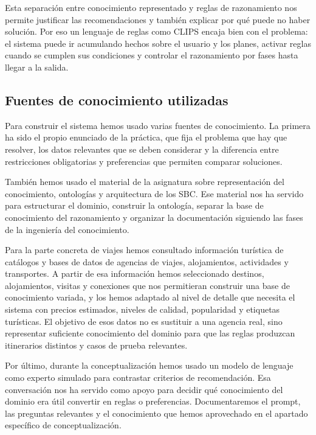 \documentclass[11pt,a4paper]{article}
\begin{document}
Esta separaci\'on entre conocimiento representado y reglas de razonamiento nos
permite justificar las recomendaciones y tambi\'en explicar por qu\'e puede no
haber soluci\'on. Por eso un lenguaje de reglas como CLIPS encaja bien con el
problema: el sistema puede ir acumulando hechos sobre el usuario y los planes,
activar reglas cuando se cumplen sus condiciones y controlar el razonamiento
por fases hasta llegar a la salida.

\subsection{Fuentes de conocimiento utilizadas}
Para construir el sistema hemos usado varias fuentes de conocimiento. La
primera ha sido el propio enunciado de la pr\'actica, que fija el problema que
hay que resolver, los datos relevantes que se deben considerar y la diferencia
entre restricciones obligatorias y preferencias que permiten comparar
soluciones.

Tambi\'en hemos usado el material de la asignatura sobre representaci\'on del
conocimiento, ontolog\'ias y arquitectura de los SBC. Ese material nos ha
servido para estructurar el dominio, construir la ontolog\'ia, separar la base de
conocimiento del razonamiento y organizar la documentaci\'on siguiendo las
fases de la ingenier\'ia del conocimiento.

Para la parte concreta de viajes hemos consultado informaci\'on tur\'istica de
cat\'alogos y bases de datos de agencias de viajes, alojamientos, actividades y
transportes. A partir de esa informaci\'on hemos seleccionado destinos,
alojamientos, visitas y conexiones que nos permitieran construir una base de
conocimiento variada, y los hemos adaptado al nivel de detalle que necesita el
sistema con precios estimados, niveles de calidad, popularidad y etiquetas
tur\'isticas. El objetivo de esos datos no es sustituir a una agencia real,
sino representar suficiente conocimiento del dominio para que las reglas
produzcan itinerarios distintos y casos de prueba relevantes.

Por \'ultimo, durante la conceptualizaci\'on hemos usado un modelo de lenguaje
como experto simulado para contrastar criterios de recomendaci\'on. Esa
conversaci\'on nos ha servido como apoyo para decidir qu\'e conocimiento del
dominio era \'util convertir en reglas o preferencias. Documentaremos el prompt,
las preguntas relevantes y el conocimiento que hemos aprovechado en el
apartado espec\'ifico de conceptualizaci\'on.
\end{document}
